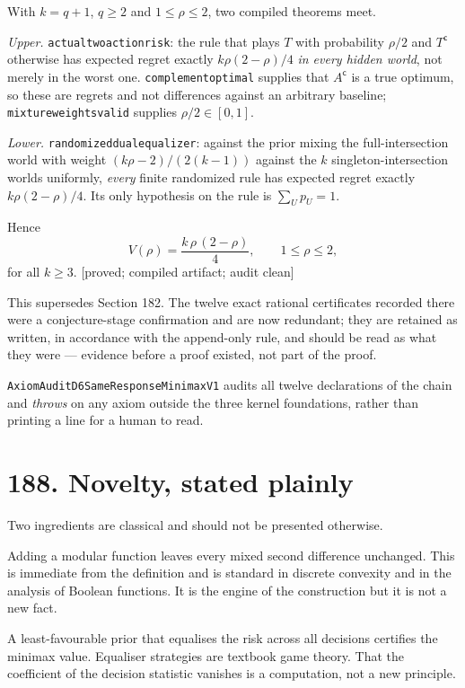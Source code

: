 \documentclass[9pt,twocolumn]{article}
\newcommand{\eclass}[1]{\textsf{[#1]}}
\renewcommand{\_}{\CIGunderscore\allowbreak}
\begin{document}
With $k=q+1$, $q\ge2$ and $1\le\rho\le2$, two compiled theorems meet.

\emph{Upper.} \texttt{actual\_two\_action\_risk}: the rule that plays $T$ with probability $\rho/2$ and $T^{\mathsf c}$ otherwise has expected regret exactly $k\rho(2-\rho)/4$ \emph{in every hidden world}, not merely in the worst one. \texttt{complement\_optimal} supplies that $A^{\mathsf c}$ is a true optimum, so these are regrets and not differences against an arbitrary baseline; \texttt{mixture\_weights\_valid} supplies $\rho/2\in[0,1]$.

\emph{Lower.} \texttt{randomized\_dual\_equalizer}: against the prior mixing the full-intersection world with weight $(k\rho-2)/(2(k-1))$ against the $k$ singleton-intersection worlds uniformly, \emph{every} finite randomized rule has expected regret exactly $k\rho(2-\rho)/4$. Its only hypothesis on the rule is $\sum_U p_U=1$.

Hence
\[ V(\rho)=\frac{k\,\rho\,(2-\rho)}{4},\qquad 1\le\rho\le2, \]
for all $k\ge3$. \eclass{proved; compiled artifact; audit clean}

This supersedes Section 182. The twelve exact rational certificates recorded there were a conjecture-stage confirmation and are now redundant; they are retained as written, in accordance with the append-only rule, and should be read as what they were --- evidence before a proof existed, not part of the proof.

\texttt{AxiomAuditD6SameResponseMinimaxV1} audits all twelve declarations of the chain and \emph{throws} on any axiom outside the three kernel foundations, rather than printing a line for a human to read.

\section*{188. Novelty, stated plainly}

Two ingredients are classical and should not be presented otherwise.

Adding a modular function leaves every mixed second difference unchanged. This is immediate from the definition and is standard in discrete convexity and in the analysis of Boolean functions. It is the engine of the construction but it is not a new fact.

A least-favourable prior that equalises the risk across all decisions certifies the minimax value. Equaliser strategies are textbook game theory. That the coefficient of the decision statistic vanishes is a computation, not a new principle.
\end{document}
